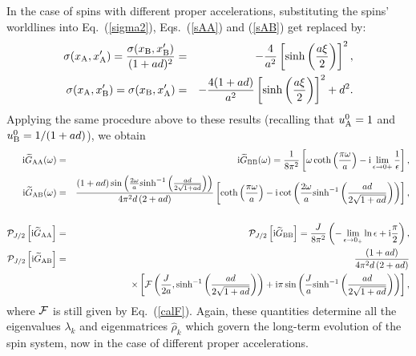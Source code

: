 \documentclass[]{nature}
\begin{document}
{In the case of spins with different proper accelerations,
substituting the spins' worldlines into Eq.~(\ref{sigma2}), Eqs.~(\ref{sAA}) and (\ref{sAB}) get replaced by:
\begin{eqnarray}
\sigma(x_{\rm A},x_{\rm A}')= \frac{\sigma(x_{\rm B},x_{\rm B}')}{(1+ad)^2} &=& -\frac{4}{a^2}\left[\sinh\left(\frac{a\xi}{2}\right)\right]^2,
\label{sAAd}
\\
\sigma(x_{\rm A},x_{\rm B}')= \sigma(x_{\rm B},x_{\rm A}') &=& -\frac{4(1+ad)}{a^2}\left[\sinh\left(\frac{a\xi}{2}\right)\right]^2+d^2.
\label{sABd}
\end{eqnarray}
Applying      the same procedure above to these results (recalling that  $u_{\rm A}^0 = 1$ and $u_{\rm B}^0 = 1/(1+ad)$), we obtain
\begin{eqnarray}
{\rm i}\widetilde{G}_{\rm AA}(\omega)&=&{\rm i}\widetilde{G}_{\rm BB}(\omega) 
=\frac{1}{8\pi^2} 
\left[\omega
\coth
\left(\frac{\pi \omega}{a}\right)-{\rm i} \lim_{\epsilon \to 0+}\frac{1}{\epsilon}\right],
\label{GFstildeddif}
\\ 
{\rm i}\widetilde{G}_{\rm AB}(\omega)& =&\frac{(1+ad)\sin\left(
\frac{2\omega}{a} {\rm sinh}^{-1} \left(\frac{ad}{2\sqrt{1+ad}}\right)\right)}{4\pi^2d\,(2+a d)} 
\left[
\coth
\left(\frac{\pi \omega}{a}\right)-{\rm i} \cot\left(
\frac{2\omega}{a} {\rm sinh}^{-1} \left(\frac{ad}{2\sqrt{1+ad}}\right)\right)\right],\nonumber \\
\label{GFitildeddif}\\
{\cal P}_{J/2}\left[{\rm i}{\widetilde G}_{\rm AA}\right] &=&{\cal P}_{J/2}\left[{\rm i}{\widetilde G}_{\rm BB}\right]
=\frac{J}{8\pi^2} 
\left(-
\lim_{\epsilon \to 0_+} \ln\epsilon +{\rm i}\frac{ \pi}{2}\right),
\label{PGFstildeddif}\\
{\cal P}_{J/2}\left[{\rm i}{\widetilde G}_{\rm AB}\right]  &=&\frac{(1+ad)}{4\pi^2d\,(2+a d)} 
\nonumber\\
& &\times
\left[
{\cal F}\left(\frac{J}{2a},{\rm sinh}^{-1}\left(\frac{ad}{2\sqrt{1+ad}}\right)\right)
+{\rm i}{\rm \pi} \sin\left(
\frac{J}{a} {\rm sinh^{-1}} \left(\frac{ad}{2\sqrt{1+ad}}\right)\right)\right],
\label{PGFitildeddif}
\end{eqnarray}
where ${\cal F}$ is still given by Eq.~(\ref{calF}).
Again, these quantities  determine all the eigenvalues $\lambda_k$ and eigenmatrices $\hat\rho_k$
which govern the long-term evolution of the spin system, now in the case of different proper accelerations.






}
\end{document}
